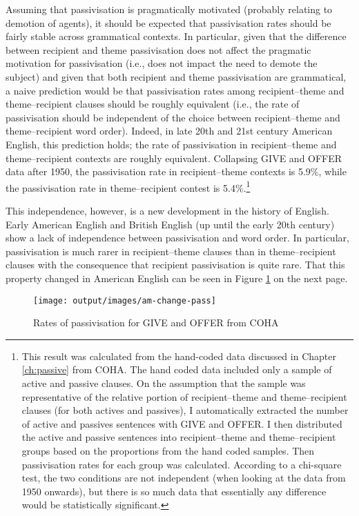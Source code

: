 	Assuming that passivisation is pragmatically motivated (probably relating to demotion of agents), it should be expected that passivisation rates should be fairly stable across grammatical contexts. In particular, given that the difference between recipient and theme passivisation does not affect the pragmatic motivation for passivisation (i.e., does not impact the need to demote the subject) and given that both recipient and theme passivisation are grammatical, a naive prediction would be that passivisation rates among recipient--theme and theme--recipient clauses should be roughly equivalent (i.e., the rate of passivisation should be independent of the choice between recipient--theme and theme--recipient word order). Indeed, in late 20th and 21st century American English, this prediction holds; the rate of passivisation in recipient--theme and theme--recipient contexts are roughly equivalent. Collapsing GIVE and OFFER data after 1950, the passivisation rate in recipient--theme contexts is 5.9\%, while the passivisation rate in theme--recipient contest is 5.4\%.\footnote{This result was calculated from the hand-coded data discussed in Chapter \ref{ch:passive} from COHA. The hand coded data included only a sample of active and passive clauses. On the assumption that the sample was representative of the relative portion of recipient--theme and theme--recipient clauses (for both actives and passives), I automatically extracted the number of active and passives sentences with GIVE and OFFER. I then distributed the active and passive sentences into recipient--theme and theme--recipient groups based on the proportions from the hand coded samples. Then passivisation rates for each group was calculated. According to a chi-square test, the two conditions are not independent (when looking at the data from 1950 onwards), but there is so much data that essentially any difference would be statistically significant.}
	
	This independence, however, is a new development in the history of English. Early American English and British English (up until the early 20th century) show a lack of independence between passivisation and word order. In particular, passivisation is much rarer in recipient--theme clauses than in theme--recipient clauses with the consequence that recipient passivisation is quite rare. That this property changed in American English can be seen in Figure \ref{fig:am-change-pass} on the next page.


	\begin{figure}[ht!]
		\texttt{[image: output/images/am-change-pass]}
		\caption{Rates of passivisation for GIVE and OFFER from COHA}
		\label{fig:am-change-pass}
	\end{figure}

